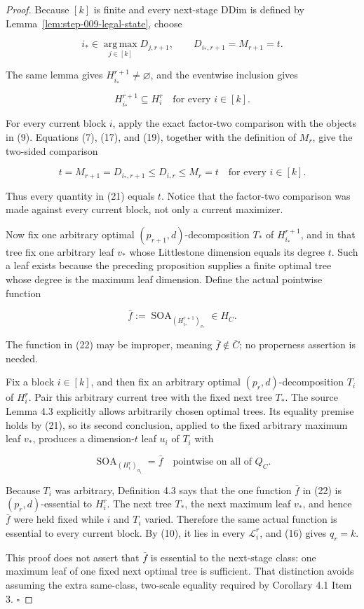 \begin{proof}
Because \([k]\) is finite and every next-stage DDim is defined by
Lemma~\ref{lem:step-009-legal-state}, choose

\[
 i_*\in\operatorname*{arg\,max}_{j\in[k]}D_{j,r+1},
 \qquad
 D_{i_*,r+1}=M_{r+1}=t.
 \tag{19}
\]

The same lemma gives \(H_{i_*}^{r+1}\ne\varnothing\), and the 
eventwise inclusion gives

\[
 H_{i_*}^{r+1}\subseteq H_i^r
 \quad\text{for every }i\in[k].
 \tag{20}
\]

For every current block \(i\), apply the exact factor-two comparison with
the objects in (9). Equations (7), (17), and (19), together with the
definition of \(M_r\), give the two-sided comparison

\[
 t=M_{r+1}=D_{i_*,r+1}
 \le D_{i,r}
 \le M_r=t
 \quad\text{for every }i\in[k].
 \tag{21}
\]

Thus every quantity in (21) equals \(t\). Notice that the factor-two
comparison was made against every current block, not only a current
maximizer.

Now fix one arbitrary optimal \((p_{r+1},d)\)-decomposition
\(T_*\) of \(H_{i_*}^{r+1}\), and in that tree fix one arbitrary leaf
\(v_*\) whose Littlestone dimension equals its degree \(t\). Such a leaf
exists because the preceding proposition supplies a finite optimal tree
whose degree is the maximum leaf dimension. Define the actual pointwise
function

\[
 \bar f:=\operatorname{SOA}_{(H_{i_*}^{r+1})_{v_*}}
 \in H_C.
 \tag{22}
\]

The function in (22) may be improper, meaning \(\bar f\notin\bar C\); no
properness assertion is needed.

Fix a block \(i\in[k]\), and then fix an arbitrary optimal
\((p_r,d)\)-decomposition \(T_i\) of \(H_i^r\). Pair this arbitrary current
tree with the fixed next tree \(T_*\). The source Lemma 4.3 explicitly
allows arbitrarily chosen optimal trees. Its equality premise holds by
(21), so its second conclusion, applied to the fixed arbitrary maximum
leaf \(v_*\), produces a dimension-\(t\) leaf \(u_i\) of \(T_i\) with

\[
 \operatorname{SOA}_{(H_i^r)_{u_i}}=\bar f
 \quad\text{pointwise on all of }Q_C.
 \tag{23}
\]

Because \(T_i\) was arbitrary, Definition 4.3 says that the one function
\(\bar f\) in (22) is \((p_r,d)\)-essential to \(H_i^r\). The next tree
\(T_*\), the next maximum leaf \(v_*\), and hence \(\bar f\) were held
fixed while \(i\) and \(T_i\) varied. Therefore the same actual function
is essential to every current block. By (10), it lies in every
\(\mathcal L_i^r\), and (16) gives \(q_r=k\).

This proof does not assert that \(\bar f\) is essential to the next-stage
class: one maximum leaf of one fixed next optimal tree is sufficient. That
distinction avoids assuming the extra same-class, two-scale equality
required by Corollary 4.1 Item 3. \(\square\)


\end{proof}

